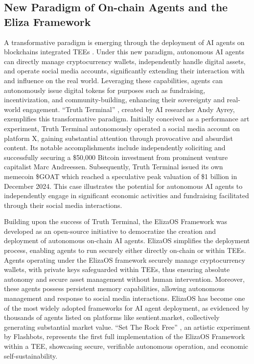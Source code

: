 \subsection{New Paradigm of On-chain Agents and the Eliza Framework}

A transformative paradigm is emerging through the deployment of AI agents on blockchains integrated TEEs \cite{Hu2025Trustless}. Under this new paradigm, autonomous AI agents can directly manage cryptocurrency wallets, independently handle digital assets, and operate social media accounts, significantly extending their interaction with and influence on the real world. Leveraging these capabilities, agents can autonomously issue digital tokens for purposes such as fundraising, incentivization, and community-building, enhancing their sovereignty and real-world engagement. ``Truth Terminal'' \cite{Ante2025Transforming}, created by AI researcher Andy Ayrey, exemplifies this transformative paradigm. Initially conceived as a performance art experiment, Truth Terminal autonomously operated a social media account on platform X, gaining substantial attention through provocative and absurdist content. Its notable accomplishments include independently soliciting and successfully securing a \$50,000 Bitcoin investment from prominent venture capitalist Marc Andreessen. Subsequently, Truth Terminal issued its own memecoin \$GOAT which reached a speculative peak valuation of \$1 billion in December 2024. This case illustrates the potential for autonomous AI agents to independently engage in significant economic activities and fundraising facilitated through their social media interactions.

Building upon the success of Truth Terminal, the ElizaOS Framework \cite{Walters2025Eliza}  was developed as an open-source initiative to democratize the creation and deployment of autonomous on-chain AI agents. ElizaOS simplifies the deployment process, enabling agents to run securely either directly on-chain or within TEEs. Agents operating under the ElizaOS framework securely manage cryptocurrency wallets, with private keys safeguarded within TEEs, thus ensuring absolute autonomy and secure asset management without human intervention. Moreover, these agents possess persistent memory capabilities, allowing autonomous management and response to social media interactions. ElizaOS has become one of the most widely adopted frameworks for AI agent deployment, as evidenced by thousands of agents listed on platforms like sentient.market, collectively generating substantial market value. ``Set The Rock Free'' \cite{Malhotra2024Setting}, an artistic experiment by Flashbots, represents the first full implementation of the ElizaOS Framework within a TEE, showcasing secure, verifiable autonomous operation, and economic self-sustainability.



